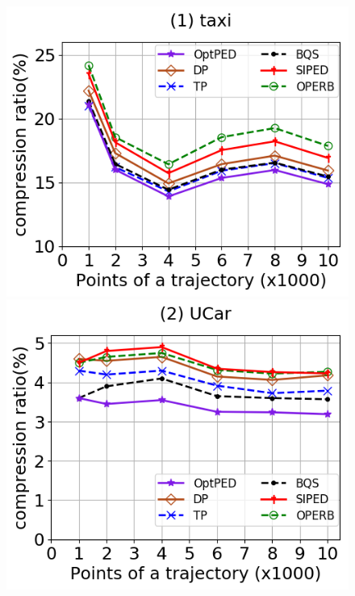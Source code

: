 \begin{figure}[tb!]
	\centering
	\includegraphics[scale=0.315]{Figures/Exp-PED-CR-size-taxi.png}\hspace{1ex}
	\includegraphics[scale=0.315]{Figures/Exp-PED-CR-size-service.png} 	\hspace{1ex}

\end{figure}
